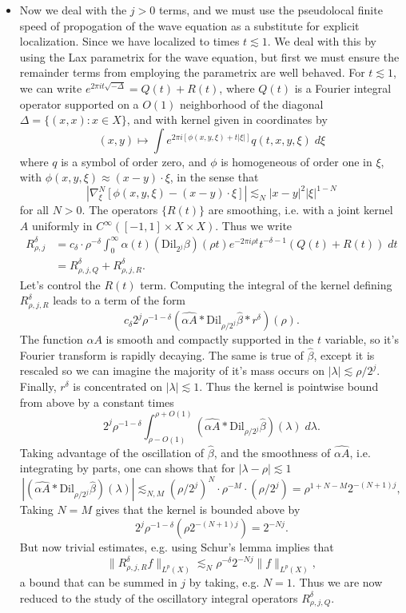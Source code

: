 \begin{itemize}
    \item Now we deal with the $j > 0$ terms, and we must use the pseudolocal finite speed of propogation of the wave equation as a substitute for explicit localization. Since we have localized to times $t \lesssim 1$. We deal with this by using the Lax parametrix for the wave equation, but first we must ensure the remainder terms from employing the parametrix are well behaved. For $t \lesssim 1$, we can write $e^{2 \pi i t \sqrt{-\Delta}} = Q(t) + R(t)$, where $Q(t)$ is a Fourier integral operator supported on a $O(1)$ neighborhood of the diagonal $\Delta = \{ (x,x): x \in X \}$, and with kernel given in coordinates by
    \[ (x,y) \mapsto \int e^{2 \pi i [\phi(x,y,\xi) + t |\xi|]} q(t,x,y,\xi)\; d\xi \]
    where $q$ is a symbol of order zero, and $\phi$ is homogeneous of order one in $\xi$, with $\phi(x,y,\xi) \approx (x - y) \cdot \xi$, in the sense that
    \[ |\nabla_\xi^N [ \phi(x,y,\xi) - (x - y) \cdot \xi ]| \lesssim_N |x - y|^2 |\xi|^{1-N} \]
    for all $N > 0$. The operators $\{ R(t) \}$ are smoothing, i.e. with a joint kernel $A$ uniformly in $C^\infty([-1,1] \times X \times X)$. Thus we write
    \begin{align*}
        R^\delta_{\rho,j} &= c_\delta \cdot \rho^{-\delta} \int_0^\infty \alpha(t) (\text{Dil}_{2^j} \beta)(\rho t) e^{- 2 \pi i \rho t} t^{-\delta - 1} ( Q(t) + R(t) )\; dt\\
        &= R^\delta_{\rho,j,Q} + R^\delta_{\rho,j,R}.
    \end{align*}
    Let's control the $R(t)$ term. Computing the integral of the kernel defining $R^\delta_{\rho,j,R}$ leads to a term of the form
    \[ c_\delta 2^j \rho^{-1-\delta} ( \widehat{\alpha A} * \text{Dil}_{\rho / 2^j} \widehat{\beta} * r^\delta)(\rho). \]
    The function $\alpha A$ is smooth and compactly supported in the $t$ variable, so it's Fourier transform is rapidly decaying. The same is true of $\widehat{\beta}$, except it is rescaled so we can imagine the majority of it's mass occurs on $|\lambda| \lesssim \rho / 2^j$. Finally, $r^\delta$ is concentrated on $|\lambda| \lesssim 1$. Thus the kernel is pointwise bound from above by a constant times
    \[ 2^j \rho^{-1-\delta} \int_{\rho - O(1)}^{\rho + O(1)} ( \widehat{\alpha A} * \text{Dil}_{\rho / 2^j} \widehat{\beta} )(\lambda)\; d\lambda. \]
    Taking advantage of the oscillation of $\widehat{\beta}$, and the smoothness of $\widehat{\alpha A}$, i.e. integrating by parts, one can shows that for $|\lambda - \rho| \lesssim 1$
    \[  |( \widehat{\alpha A} * \text{Dil}_{\rho / 2^j} \widehat{\beta} )(\lambda)| \lesssim_{N,M} (\rho / 2^j)^N \cdot \rho^{-M} \cdot (\rho / 2^j) = \rho^{1+N-M} 2^{-(N+1)j}, \]
    Taking $N = M$ gives that the kernel is bounded above by
    \[ 2^j \rho^{-1-\delta} \left( \rho 2^{-(N+1)j} \right) = 2^{-Nj}. \]
    But now trivial estimates, e.g. using Schur's lemma implies that
    \[ \| R^\delta_{\rho,j,R} f \|_{L^p(X)} \lesssim_N \rho^{-\delta} 2^{-Nj} \| f \|_{L^p(X)}, \]
    a bound that can be summed in $j$ by taking, e.g. $N = 1$. Thus we are now reduced to the study of the oscillatory integral operators $R^\delta_{\rho,j,Q}$.


\end{itemize}
